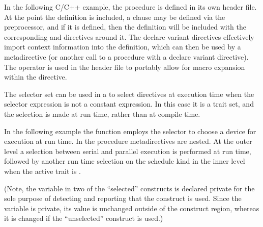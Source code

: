 In the following C/C++ example, the procedure  is defined in
its own header file. At the point the definition is included, a 
clause may be defined via the preprocessor, and if it is defined, then the
definition will be included with the corresponding 
and  directives around it. The declare variant
directives effectively import context information into the definition, which
can then be used by a metadirective (or another call to a procedure with a
declare variant directive). The  operator is used in the header
file to portably allow for macro expansion within the directive.

\begin{ccppspecific}
\end{ccppspecific}



The  selector set can be used in a 
to select directives at execution time when the 
 selector expression is not a constant expression.
In this case it is a  trait set, and the selection is made at run time, rather
than at compile time.

In the following example the  function employs the 
selector to choose a device for execution at run time. 
In the  procedure metadirectives are nested.
At the outer level a selection between serial and parallel execution is performed
at run time, followed by another run time selection on the schedule kind in the inner
level when the active  trait is .

(Note, the variable  in two of the ``selected'' constructs is declared private for the sole purpose 
of detecting and reporting that the construct is used. Since the variable is private, its value 
is unchanged outside of the construct region, whereas it is changed if the ``unselected'' construct
is used.)


